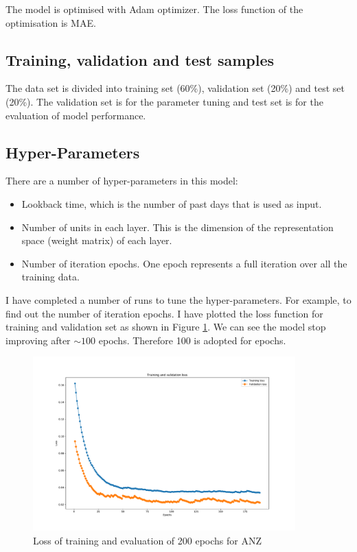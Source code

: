 \documentclass[a4paper, 11pt, usenatbib]{article}
\begin{document}
The model is optimised with Adam optimizer. The loss function of the optimisation is MAE.

\subsection{Training, validation and test samples}
The data set is divided into training set (60\%), validation set (20\%) and test set (20\%). The validation set is for the parameter tuning and test set is for the evaluation of model performance.


\subsection{Hyper-Parameters}
There are a number of hyper-parameters in this model:
\begin{itemize}

\item Lookback time, which is the number of past days that is used as input.
\item Number of units in each layer. This is the dimension of the representation space (weight matrix) of each layer.
\item Number of iteration epochs. One epoch represents a full iteration over all the training data.
\end{itemize}
I have completed a number of runs to tune the hyper-parameters.
For example, to find out the number of iteration epochs.
I have plotted the loss function for training and validation set as shown in Figure \ref{fig:regression_epochs}. We can see  the model stop improving after $\sim 100$ epochs. Therefore 100 is adopted for epochs.

\begin{figure}
	\centering
	\includegraphics[width=0.9\textwidth]{./figures/regression_epochs.pdf}
	\caption[]
	{Loss of training and evaluation of 200 epochs for ANZ}
		\label{fig:regression_epochs}
\end{figure}
\end{document}
